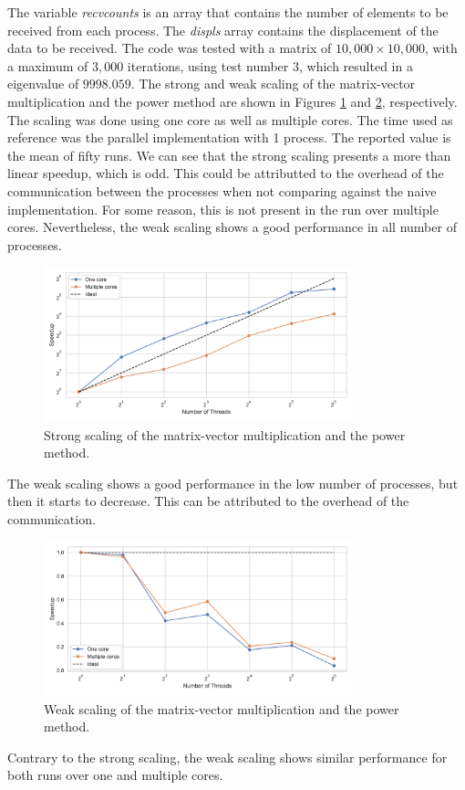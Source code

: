 \documentclass[unicode,11pt,a4paper,oneside,numbers=endperiod,openany]{scrartcl}
\begin{document}
The variable \textit{recvcounts} is an array that contains the number of
elements to be received from each process. The \textit{displs} array contains
the displacement of the data to be received. The code was tested with a matrix
of $10,000\times 10,000$, with a maximum of $3,000$ iterations, using test
number $3$, which resulted in a eigenvalue of $9998.059$. The strong and weak
scaling of the matrix-vector multiplication and the power method are shown in
Figures \ref{fig:strong_scaling} and \ref{fig:weak_scaling}, respectively. 
The scaling was done using one core as well as multiple cores.
The
time used as reference was the parallel implementation with 1 process. The
reported value is the mean of fifty runs. We can see that the strong scaling
presents a more than linear speedup, which is odd. This could be attributted to
the overhead of the communication between the processes when not comparing against
the naive implementation. For some reason, this is not present in the run over
multiple cores. Nevertheless, the weak scaling shows a good performance in all
number of processes.

\begin{figure}[h!]
    \centering
    \includegraphics[width=0.8\textwidth]{../powermethod/strong_scaling_plot.pdf}
    \caption{Strong scaling of the matrix-vector multiplication and the power method.}
    \label{fig:strong_scaling}
\end{figure}
The weak scaling shows a good performance in the low number of processes, but
then it starts to decrease. This can be attributed to the overhead of the
communication. 
\begin{figure}[h!]
    \centering
    \includegraphics[width=0.8\textwidth]{../powermethod/weak_scaling_plot.pdf}
    \caption{Weak scaling of the matrix-vector multiplication and the power method.}
    \label{fig:weak_scaling}
\end{figure}
Contrary to the strong scaling, the weak scaling shows similar performance for
both runs over one and multiple cores.
\end{document}
